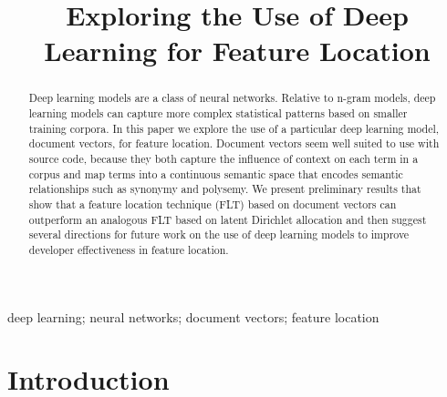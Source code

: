 \documentclass[conference]{IEEEtran}
\begin{document}
\title{Exploring the Use of Deep Learning for Feature Location}
\author{
    \and
    \and
}


\maketitle

\begin{abstract}

Deep learning models are a class of neural networks. Relative to n-gram models,
deep learning models can capture more complex statistical patterns based on
smaller training corpora. In this paper we explore the use of a particular deep
learning model, document vectors, for feature location.  Document vectors seem
well suited to use with source code, because they both capture the influence of
context on each term in a corpus and map terms into a continuous semantic space
that encodes semantic relationships such as synonymy and polysemy. We present
preliminary results that show that a feature location technique (FLT) based on
document vectors can outperform an analogous FLT based on latent Dirichlet
allocation and then suggest several directions for future work on the use of
deep learning models to improve developer effectiveness in feature location. 

\end{abstract}

\begin{IEEEkeywords}
deep learning;
neural networks;
document vectors;
feature location
\end{IEEEkeywords}

\section{Introduction}\label{introduction}

\end{document}
